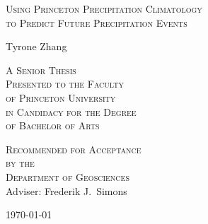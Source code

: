 \thispagestyle{empty}
  \begin{center}
    \textsc{\LARGE Using Princeton Precipitation Climatology\\ to Predict Future Precipitation Events} %
  \end{center}
  \vspace{.6in}
  \begin{center}
      Tyrone Zhang
  \end{center}
  \vspace{.6in}
  \begin{center}
    \textsc{A Senior Thesis \\ %
    Presented to the Faculty \\
    of Princeton University \\
    in Candidacy for the Degree \\
    of Bachelor of Arts}
  \end{center}
  \vspace{.3in}
  \begin{center}
    \textsc{Recommended for Acceptance \\
    by the \\Department of  Geosciences \\}
    Adviser: Frederik J.~Simons
  \end{center}
  \vspace{.3in}
  \begin{center}
  \today
  \end{center}
  
  \clearpage

